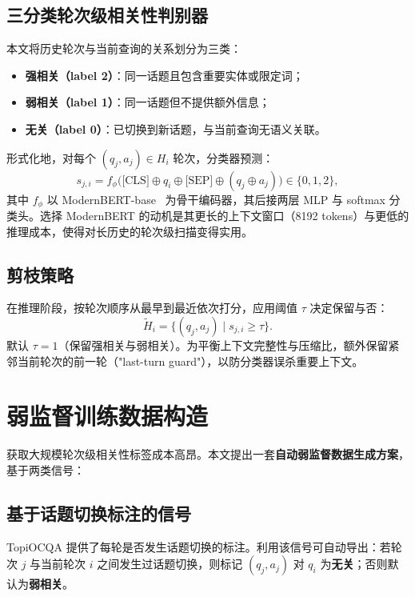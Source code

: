 \subsection{三分类轮次级相关性判别器}

本文将历史轮次与当前查询的关系划分为三类：
\begin{itemize}
    \item \textbf{强相关（label 2）}：同一话题且包含重要实体或限定词；
    \item \textbf{弱相关（label 1）}：同一话题但不提供额外信息；
    \item \textbf{无关（label 0）}：已切换到新话题，与当前查询无语义关联。
\end{itemize}

形式化地，对每个 $(q_j, a_j) \in H_i$ 轮次，分类器预测：
\begin{equation}
s_{j,i} = f_\phi\big(\text{[CLS]} \oplus q_i \oplus \text{[SEP]} \oplus (q_j \oplus a_j)\big) \in \{0,1,2\},
\end{equation}
其中 $f_\phi$ 以 ModernBERT-base~\citep{warner2024modernbert} 为骨干编码器，其后接两层 MLP 与 softmax 分类头。选择 ModernBERT 的动机是其更长的上下文窗口（8192 tokens）与更低的推理成本，使得对长历史的轮次级扫描变得实用。

\subsection{剪枝策略}

在推理阶段，按轮次顺序从最早到最近依次打分，应用阈值 $\tau$ 决定保留与否：
\begin{equation}
\tilde H_i = \{(q_j, a_j)\mid s_{j,i} \geq \tau\}.
\end{equation}
默认 $\tau=1$（保留强相关与弱相关）。为平衡上下文完整性与压缩比，额外保留紧邻当前轮次的前一轮（"last-turn guard"），以防分类器误杀重要上下文。

\section{弱监督训练数据构造}
\label{sec:hp_data}

获取大规模轮次级相关性标签成本高昂。本文提出一套\textbf{自动弱监督数据生成方案}，基于两类信号：

\subsection{基于话题切换标注的信号}

TopiOCQA 提供了每轮是否发生话题切换的标注。利用该信号可自动导出：若轮次 $j$ 与当前轮次 $i$ 之间发生过话题切换，则标记 $(q_j, a_j)$ 对 $q_i$ 为\textbf{无关}；否则默认为\textbf{弱相关}。

